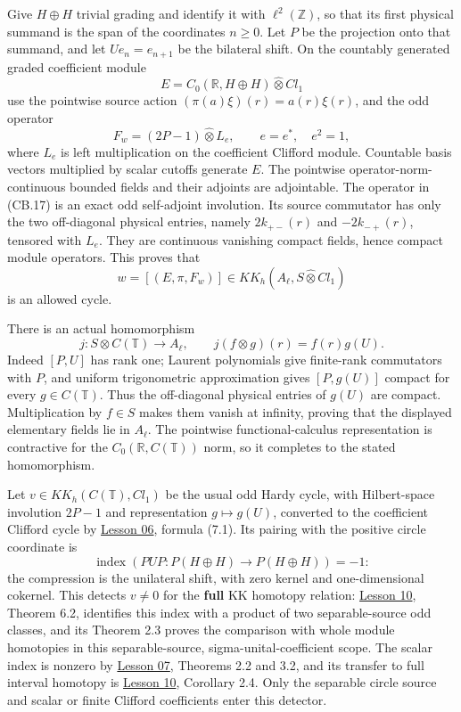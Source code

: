 \documentclass[
  11pt,
]{article}
\begin{document}
Give \(H\oplus H\) trivial grading and identify it with
\(\ell^2(\mathbb Z)\), so that its first physical summand is the span of
the coordinates \(n\geq0\). Let \(P\) be the projection onto that
summand, and let \(Ue_n=e_{n+1}\) be the bilateral shift. On the
countably generated graded coefficient module \[
 E=C_0(\mathbb R,H\oplus H)\widehat\otimes Cl_1
\] use the pointwise source action \((\pi(a)\xi)(r)=a(r)\xi(r)\), and
the odd operator \[
 F_w=(2P-1)\widehat\otimes L_e,
 \qquad e=e^*,\quad e^2=1,
 \tag{CB.17}
\] where \(L_e\) is left multiplication on the coefficient Clifford
module. Countable basis vectors multiplied by scalar cutoffs generate
\(E\). The pointwise operator-norm-continuous bounded fields and their
adjoints are adjointable. The operator in (CB.17) is an exact odd
self-adjoint involution. Its source commutator has only the two
off-diagonal physical entries, namely \(2k_{+-}(r)\) and
\(-2k_{-+}(r)\), tensored with \(L_e\). They are continuous vanishing
compact fields, hence compact module operators. This proves that \[
 w=[(E,\pi,F_w)]\in KK_h(A_\ell,S\widehat\otimes Cl_1)
 \tag{CB.18}
\] is an allowed cycle.

There is an actual homomorphism \[
 j:S\otimes C(\mathbb T)\longrightarrow A_\ell,
 \qquad j(f\otimes g)(r)=f(r)g(U).
 \tag{CB.19}
\] Indeed \([P,U]\) has rank one; Laurent polynomials give finite-rank
commutators with \(P\), and uniform trigonometric approximation gives
\([P,g(U)]\) compact for every \(g\in C(\mathbb T)\). Thus the
off-diagonal physical entries of \(g(U)\) are compact. Multiplication by
\(f\in S\) makes them vanish at infinity, proving that the displayed
elementary fields lie in \(A_\ell\). The pointwise functional-calculus
representation is contractive for the \(C_0(\mathbb R,C(\mathbb T))\)
norm, so it completes to the stated homomorphism.

Let \(v\in KK_h(C(\mathbb T),Cl_1)\) be the usual odd Hardy cycle, with
Hilbert-space involution \(2P-1\) and representation \(g\mapsto g(U)\),
converted to the coefficient Clifford cycle by
\href{KT-KK-06.html}{Lesson 06}, formula (7.1). Its pairing with the
positive circle coordinate is \[
 \operatorname{index}(PUP:P(H\oplus H)\to P(H\oplus H))=-1:
\] the compression is the unilateral shift, with zero kernel and
one-dimensional cokernel. This detects \(v\ne0\) for the \textbf{full}
KK homotopy relation: \href{KT-KK-10.html}{Lesson 10}, Theorem 6.2,
identifies this index with a product of two separable-source odd
classes, and its Theorem 2.3 proves the comparison with whole module
homotopies in this separable-source, sigma-unital-coefficient scope. The
scalar index is nonzero by \href{KT-KK-07.html}{Lesson 07}, Theorems 2.2
and 3.2, and its transfer to full interval homotopy is
\href{KT-KK-10.html}{Lesson 10}, Corollary 2.4. Only the separable
circle source and scalar or finite Clifford coefficients enter this
detector.
\end{document}
